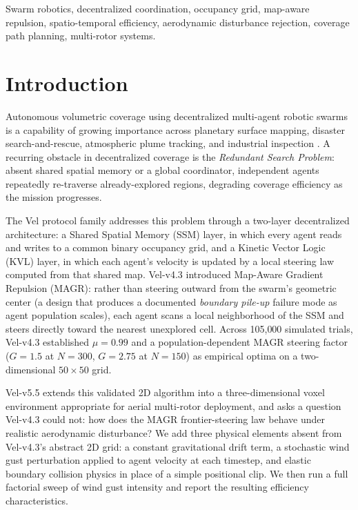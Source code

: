 \documentclass[10pt,journal]{IEEEtran}
\begin{document}
\begin{IEEEkeywords}
Swarm robotics, decentralized coordination, occupancy grid, map-aware
repulsion, spatio-temporal efficiency, aerodynamic disturbance rejection,
coverage path planning, multi-rotor systems.
\end{IEEEkeywords}

\section{Introduction}
\label{sec:intro}

Autonomous volumetric coverage using decentralized multi-agent robotic
swarms is a capability of growing importance across planetary surface
mapping, disaster search-and-rescue, atmospheric plume tracking, and
industrial inspection \cite{latombe1991, brambilla2013review}. A recurring
obstacle in decentralized coverage is the \textit{Redundant Search
Problem}: absent shared spatial memory or a global coordinator, independent
agents repeatedly re-traverse already-explored regions, degrading coverage
efficiency as the mission progresses.

The Vel protocol family addresses this problem through a two-layer
decentralized architecture: a Shared Spatial Memory (SSM) layer, in which
every agent reads and writes to a common binary occupancy grid, and a
Kinetic Vector Logic (KVL) layer, in which each agent's velocity is updated
by a local steering law computed from that shared map. Vel-v4.3 introduced
Map-Aware Gradient Repulsion (MAGR): rather than steering outward from the
swarm's geometric center (a design that produces a documented
\textit{boundary pile-up} failure mode as agent population scales), each
agent scans a local neighborhood of the SSM and steers directly toward the
nearest unexplored cell. Across 105{,}000 simulated trials, Vel-v4.3
established $\mu=0.99$ and a population-dependent MAGR steering factor
($G=1.5$ at $N=300$, $G=2.75$ at $N=150$) as empirical optima on a
two-dimensional $50\times50$ grid.

Vel-v5.5 extends this validated 2D algorithm into a three-dimensional voxel
environment appropriate for aerial multi-rotor deployment, and asks a
question Vel-v4.3 could not: how does the MAGR frontier-steering law behave
under realistic aerodynamic disturbance? We add three physical elements
absent from Vel-v4.3's abstract 2D grid: a constant gravitational drift
term, a stochastic wind gust perturbation applied to agent velocity at each
timestep, and elastic boundary collision physics in place of a simple
positional clip. We then run a full factorial sweep of wind gust intensity
and report the resulting efficiency characteristics.
\end{document}
